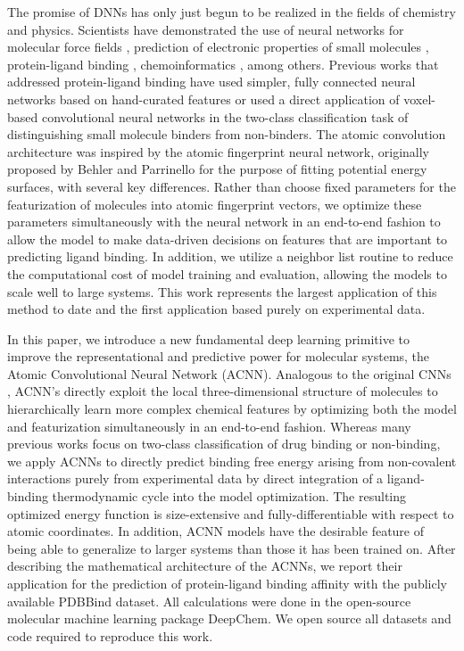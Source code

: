 The promise of DNNs has only just begun to be realized in the fields of chemistry and physics. Scientists have demonstrated the use of neural networks for molecular force fields \cite{behler2007nnpes,behler2011atomnn}, prediction of electronic properties of small molecules \cite{montavon2013machine}, protein-ligand binding \cite{durrant2011nnscore, wallach2015atomnet,ragoza2016protein}, chemoinformatics \cite{duvenaud2015convolutional, kearnes2016molecular, altae2016low}, among others. Previous works that addressed protein-ligand binding have used simpler, fully connected neural networks based on hand-curated features \cite{durrant2011nnscore} or used a direct application of voxel-based convolutional neural networks in the two-class classification task of distinguishing small molecule binders from non-binders. \cite{wallach2015atomnet,ragoza2016protein}  The atomic convolution architecture was inspired by the atomic fingerprint neural network, originally proposed by Behler and Parrinello \cite{behler2007nnpes,behler2011atomnn} for the purpose of fitting potential energy surfaces, with several key differences.  Rather than choose fixed parameters for the featurization of molecules into atomic fingerprint vectors, we optimize these parameters simultaneously with the neural network in an end-to-end fashion to allow the model to make data-driven decisions on features that are important to predicting ligand binding.  In addition, we utilize a neighbor list routine to reduce the computational cost of model training and evaluation, allowing the models to scale well to large systems.  This work represents the largest application of this method to date and the first application based purely on experimental data.

In this paper, we introduce a new fundamental deep learning primitive to improve the representational and predictive power for molecular systems, the Atomic Convolutional Neural Network (ACNN). Analogous to the original CNNs \cite{krizhevsky2012imagenet, lecun1995comparison}, ACNN's directly exploit the local three-dimensional structure of molecules to hierarchically learn more complex chemical features by optimizing both the model and featurization simultaneously in an end-to-end fashion.
Whereas many previous works focus on two-class classification of drug binding or non-binding, we apply ACNNs to directly predict binding free energy arising from non-covalent interactions purely from experimental data by direct integration of a ligand-binding thermodynamic cycle into the model optimization.  The resulting optimized energy function is size-extensive and fully-differentiable with respect to atomic coordinates.  In addition, ACNN models have the desirable feature of being able to generalize to larger systems than those it has been trained on.  After describing the mathematical architecture of the ACNNs, we report their application for the prediction of protein-ligand binding affinity with the publicly available PDBBind dataset. \cite{wang2005pdbbind}  All calculations were done in the open-source molecular machine learning package DeepChem.\cite{deepchem}  We open source all datasets and code required to reproduce this work.

